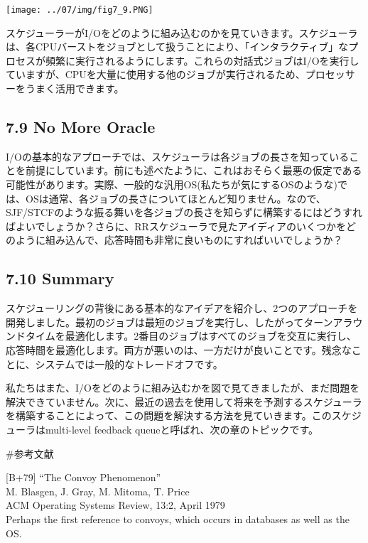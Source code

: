 \texttt{[image: ../07/img/fig7\_9.PNG]}

スケジューラーがI/Oをどのように組み込むのかを見ていきます。スケジューラは、各CPUバーストをジョブとして扱うことにより、「インタラクティブ」なプロセスが頻繁に実行されるようにします。これらの対話式ジョブはI/Oを実行していますが、CPUを大量に使用する他のジョブが実行されるため、プロセッサーをうまく活用できます。

\hypertarget{no-more-oracle}{%
\subsection*{7.9 No More Oracle}\label{no-more-oracle}}

I/Oの基本的なアプローチでは、スケジューラは各ジョブの長さを知っていることを前提にしています。前にも述べたように、これはおそらく最悪の仮定である可能性があります。実際、一般的な汎用OS(私たちが気にするOSのような)では、OSは通常、各ジョブの長さについてほとんど知りません。なので、SJF/STCFのような振る舞いを各ジョブの長さを知らずに構築するにはどうすればよいでしょうか？さらに、RRスケジューラで見たアイディアのいくつかをどのように組み込んで、応答時間も非常に良いものにすればいいでしょうか？

\hypertarget{summary-2}{%
\subsection*{7.10 Summary}\label{summary-2}}

スケジューリングの背後にある基本的なアイデアを紹介し、2つのアプローチを開発しました。最初のジョブは最短のジョブを実行し、したがってターンアラウンドタイムを最適化します。2番目のジョブはすべてのジョブを交互に実行し、応答時間を最適化します。両方が悪いのは、一方だけが良いことです。残念なことに、システムでは一般的なトレードオフです。

私たちはまた、I/Oをどのように組み込むかを図で見てきましたが、まだ問題を解決できていません。次に、最近の過去を使用して将来を予測するスケジューラを構築することによって、この問題を解決する方法を見ていきます。このスケジューラはmulti-level
feedback queueと呼ばれ、次の章のトピックです。

\#参考文献

{[}B+79{]} ``The Convoy Phenomenon''\\
M. Blasgen, J. Gray, M. Mitoma, T. Price\\
ACM Operating Systems Review, 13:2, April 1979\\
Perhaps the first reference to convoys, which occurs in databases as
well as the OS.

